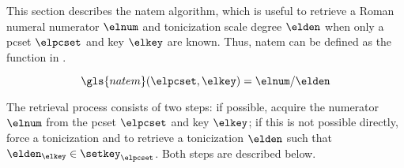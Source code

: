 
This section describes the \gls{natem} algorithm, which is
useful to retrieve a Roman numeral numerator $\elnum$ and
tonicization scale degree $\elden$ when only a \gls{pcset}
$\elpcset$ and key $\elkey$ are known. Thus, \gls{natem} can
be defined as the function in .

\begin{equation}
    \label{eq:natem}
    \gls{natem}(\elpcset, \elkey) = \elnum\text{/}\elden
\end{equation}

The retrieval process consists of two steps: if possible,
acquire the numerator $\elnum$ from the \gls{pcset}
$\elpcset$ and key $\elkey$; if this is not possible
directly, force a tonicization and to retrieve a
tonicization $\elden$ such that $\elden_\elkey \in
\setkey_\elpcset$. Both steps are described below.

